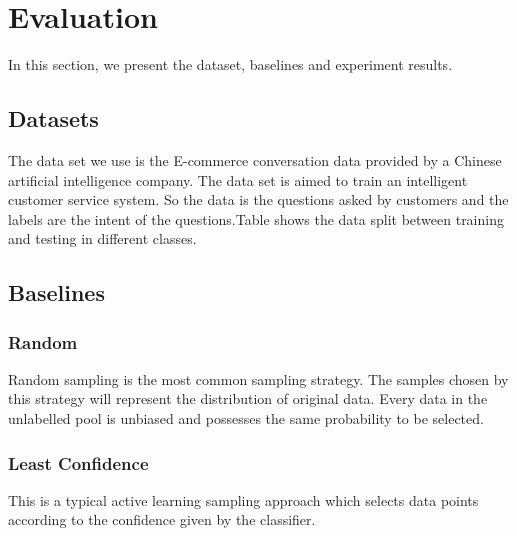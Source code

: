 \section{Evaluation}
\label{sec:eval}
In this section, we present the dataset, baselines and experiment results.

\subsection{Datasets}
The data set we use is the E-commerce conversation data provided by a Chinese artificial intelligence company. The data set is aimed to train an intelligent customer service system. So the data is the questions asked by customers and the labels are the intent of the questions.Table   shows the data split between training and testing in different classes.

\begin{table}[th!]
\small
\centering
{}
\caption{Data Split}
\label{tab:size}
\end{table}

\subsection{Baselines}
\subsubsection*{Random}
Random sampling is the most common sampling strategy. The samples chosen by this strategy will represent the distribution of original data. Every data in the unlabelled pool is unbiased and possesses the same probability to be selected.

\subsubsection*{Least Confidence}
This is a typical active learning sampling approach which selects data points according to the confidence given by the classifier. 

